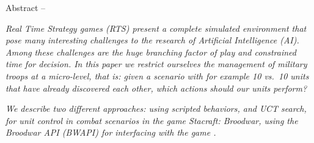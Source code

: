 \begin{bfseries} Abstract -- \end{bfseries}
\emph{
Real Time Strategy games (RTS) present a complete simulated environment that pose many interesting challenges to the research of Artificial Intelligence (AI).
Among these challenges are the huge branching factor of play and constrained time for decision.
In this paper we restrict ourselves the management of military troops at a micro-level, that is: given a scenario with for example 10 vs.\ 10 units that have already discovered each other, which actions should our units perform?
}

\emph{
We describe two different approaches: using scripted behaviors, and UCT search, for unit control in combat scenarios in the game Stacraft: Broodwar, using the Broodwar API (BWAPI) for interfacing with the game \cite{BWAPI}.
}
